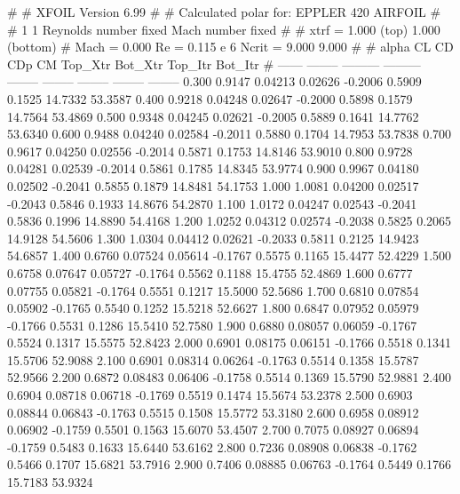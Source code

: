 #  
#       XFOIL         Version 6.99
#  
# Calculated polar for: EPPLER 420 AIRFOIL                              
#  
# 1 1 Reynolds number fixed          Mach number fixed         
#  
# xtrf =   1.000 (top)        1.000 (bottom)  
# Mach =   0.000     Re =     0.115 e 6     Ncrit =   9.000  9.000
#  
#   alpha    CL        CD       CDp       CM     Top_Xtr  Bot_Xtr  Top_Itr  Bot_Itr
#  ------ -------- --------- --------- -------- -------- -------- -------- --------
   0.300   0.9147   0.04213   0.02626  -0.2006   0.5909   0.1525  14.7332  53.3587
   0.400   0.9218   0.04248   0.02647  -0.2000   0.5898   0.1579  14.7564  53.4869
   0.500   0.9348   0.04245   0.02621  -0.2005   0.5889   0.1641  14.7762  53.6340
   0.600   0.9488   0.04240   0.02584  -0.2011   0.5880   0.1704  14.7953  53.7838
   0.700   0.9617   0.04250   0.02556  -0.2014   0.5871   0.1753  14.8146  53.9010
   0.800   0.9728   0.04281   0.02539  -0.2014   0.5861   0.1785  14.8345  53.9774
   0.900   0.9967   0.04180   0.02502  -0.2041   0.5855   0.1879  14.8481  54.1753
   1.000   1.0081   0.04200   0.02517  -0.2043   0.5846   0.1933  14.8676  54.2870
   1.100   1.0172   0.04247   0.02543  -0.2041   0.5836   0.1996  14.8890  54.4168
   1.200   1.0252   0.04312   0.02574  -0.2038   0.5825   0.2065  14.9128  54.5606
   1.300   1.0304   0.04412   0.02621  -0.2033   0.5811   0.2125  14.9423  54.6857
   1.400   0.6760   0.07524   0.05614  -0.1767   0.5575   0.1165  15.4477  52.4229
   1.500   0.6758   0.07647   0.05727  -0.1764   0.5562   0.1188  15.4755  52.4869
   1.600   0.6777   0.07755   0.05821  -0.1764   0.5551   0.1217  15.5000  52.5686
   1.700   0.6810   0.07854   0.05902  -0.1765   0.5540   0.1252  15.5218  52.6627
   1.800   0.6847   0.07952   0.05979  -0.1766   0.5531   0.1286  15.5410  52.7580
   1.900   0.6880   0.08057   0.06059  -0.1767   0.5524   0.1317  15.5575  52.8423
   2.000   0.6901   0.08175   0.06151  -0.1766   0.5518   0.1341  15.5706  52.9088
   2.100   0.6901   0.08314   0.06264  -0.1763   0.5514   0.1358  15.5787  52.9566
   2.200   0.6872   0.08483   0.06406  -0.1758   0.5514   0.1369  15.5790  52.9881
   2.400   0.6904   0.08718   0.06718  -0.1769   0.5519   0.1474  15.5674  53.2378
   2.500   0.6903   0.08844   0.06843  -0.1763   0.5515   0.1508  15.5772  53.3180
   2.600   0.6958   0.08912   0.06902  -0.1759   0.5501   0.1563  15.6070  53.4507
   2.700   0.7075   0.08927   0.06894  -0.1759   0.5483   0.1633  15.6440  53.6162
   2.800   0.7236   0.08908   0.06838  -0.1762   0.5466   0.1707  15.6821  53.7916
   2.900   0.7406   0.08885   0.06763  -0.1764   0.5449   0.1766  15.7183  53.9324
